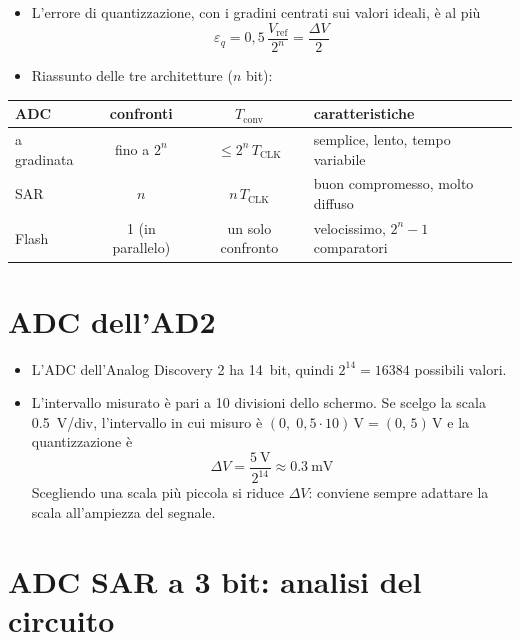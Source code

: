 \begin{itemize}[leftmargin=1.5em, itemsep=2pt]
    \item L'errore di quantizzazione, con i gradini centrati sui valori ideali, è al più
          \[
          \varepsilon_q = 0{,}5\,\frac{V_{\text{ref}}}{2^n} = \frac{\Delta V}{2}
          \]
    \item Riassunto delle tre architetture ($n$ bit):
\end{itemize}

\begin{center}
\begin{tabular}{l|c|c|l}
\toprule
ADC & confronti & $T_{\text{conv}}$ & caratteristiche \\
\midrule
a gradinata & fino a $2^n$ & $\le 2^n\,T_{\text{CLK}}$ & semplice, lento, tempo variabile \\
SAR & $n$ & $n\,T_{\text{CLK}}$ & buon compromesso, molto diffuso \\
Flash & 1 (in parallelo) & un solo confronto & velocissimo, $2^n-1$ comparatori \\
\bottomrule
\end{tabular}
\end{center}

\section{ADC dell'AD2}

\begin{itemize}[leftmargin=1.5em, itemsep=2pt]
    \item L'ADC dell'Analog Discovery 2 ha \SI{14}{bit}, quindi $2^{14} = 16384$ possibili
          valori.
    \item L'intervallo misurato è pari a 10 divisioni dello schermo. Se scelgo la scala
          \SI{0.5}{\volt}/div, l'intervallo in cui misuro è
          $(0,\; 0{,}5 \cdot 10)\,\si{\volt} = (0,\,5)\,\si{\volt}$ e la quantizzazione è
          \[
          \Delta V = \frac{\SI{5}{\volt}}{2^{14}} \approx \SI{0.3}{\milli\volt}
          \]
          Scegliendo una scala più piccola si riduce $\Delta V$: conviene sempre adattare la
          scala all'ampiezza del segnale.
\end{itemize}

\section{ADC SAR a 3 bit: analisi del circuito}
\label{sec:sar3bit}

